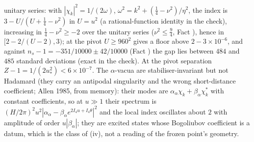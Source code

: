 unitary series: with $|\chi_{k}|^{2} = 1/(2\omega)$, $\omega^{2} = k^{2} + (\tfrac14 - \nu^{2})/\eta^{2}$, the index is $3 - U/(U + \tfrac14 - \nu^{2})$ in $U = u^{2}$ (a rational-function identity in the check), increasing in $\tfrac14 - \nu^{2} \ge -2$ over the unitary series ($\nu^{2} \le \tfrac94$, Fact ), hence in $[2 - 2/(U - 2), 3)$; at the pivot $U \ge 960^{2}$ gives a floor above $2 - 3 \times 10^{-6}$, and against $n_{s} - 1 = -351/10000 \pm 42/10000$ (Fact ) the gap lies between $484$ and $485$ standard deviations (exact in the check). At the pivot separation $Z - 1 = 1/(2u_{*}^{2}) < 6 \times 10^{-7}$. The $\alpha$-vacua are stabiliser-invariant but not Hadamard (they carry an antipodal singularity and the wrong short-distance coefficient; Allen 1985, from memory): their modes are $\alpha_{\alpha}\chi_{k} + \beta_{\alpha}\chi_{k}^{*}$ with constant coefficients, so at $u \gg 1$ their spectrum is $(H/2\pi)^{2}u^{2}|\alpha_{\alpha} - \beta_{\alpha}e^{2I_4u + I_4\theta}|^{2}$ and the local index oscillates about $2$ with amplitude of order $u|\beta_{\alpha}|$; they are excited states whose Bogoliubov coefficient is a datum, which is the class of (iv), not a reading of the frozen point's geometry.


